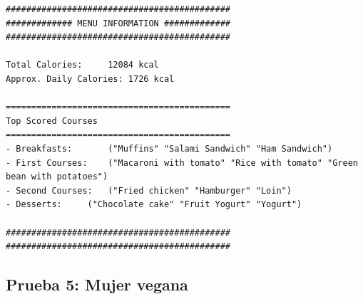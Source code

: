 \documentclass[11]{article}
\begin{document}
\begin{lstlisting}[frame=single]
############################################
############# MENU INFORMATION #############
############################################

Total Calories:		12084 kcal
Approx. Daily Calories:	1726 kcal

============================================
Top Scored Courses
============================================
- Breakfasts:		("Muffins" "Salami Sandwich" "Ham Sandwich")
- First Courses:	("Macaroni with tomato" "Rice with tomato" "Green bean with potatoes")
- Second Courses:	("Fried chicken" "Hamburger" "Loin")
- Desserts:		("Chocolate cake" "Fruit Yogurt" "Yogurt")

############################################
############################################
\end{lstlisting}

\subsection{Prueba 5: Mujer vegana}
\end{document}
